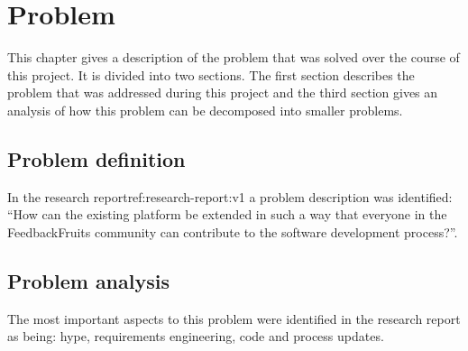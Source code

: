 \chapter{Problem}

This chapter gives a description of the problem that was solved over the course of this project. It is divided into two sections. The first section describes the problem that was addressed during this project and the third section gives an analysis of how this problem can be decomposed into smaller problems.

\section{Problem definition}
In the research report{ref:research-report:v1} a problem description was identified: ``How can the existing platform be extended in such a way that everyone in the FeedbackFruits community can contribute to the software development process?''.

\section{Problem analysis}
The most important aspects to this problem were identified in the research report as being: hype, requirements engineering, code and process updates. 

